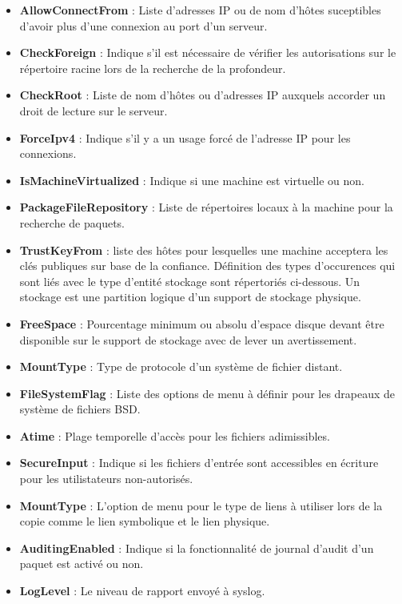 \begin{itemize}
  \item \textbf{AllowConnectFrom} : Liste d'adresses IP ou de nom d'hôtes
	  suceptibles d'avoir plus d'une connexion au port d'un serveur.
  \item \textbf{CheckForeign} : Indique s'il est nécessaire de vérifier les
	  autorisations sur le répertoire racine lors de la recherche de la
	  profondeur.
  \item \textbf{CheckRoot} : Liste de nom d'hôtes ou d'adresses IP auxquels
	  accorder un droit de lecture sur le serveur.
  \item \textbf{ForceIpv4} : Indique s'il y a un usage forcé de l'adresse IP
	  pour les connexions.
  \item \textbf{IsMachineVirtualized} : Indique si une machine est virtuelle ou
	  non.
  \item \textbf{PackageFileRepository} : Liste de répertoires locaux à la
	  machine pour la recherche de paquets.
  \item \textbf{TrustKeyFrom} : liste des hôtes pour lesquelles une machine
	  acceptera les clés publiques sur base de la confiance. Définition des
	  types d'occurences qui sont liés avec le type d'entité stockage sont
	  répertoriés ci-dessous. Un stockage est une partition logique d'un
	  support de stockage physique.
  \item \textbf{FreeSpace} : Pourcentage minimum ou absolu d'espace disque
	  devant être disponible sur le support de stockage avec de lever un
	  avertissement.
  \item \textbf{MountType} : Type de protocole d'un système de fichier distant. 
  \item \textbf{FileSystemFlag} : Liste des options de menu à définir pour les
	  drapeaux de système de fichiers BSD. 
  \item \textbf{Atime} : Plage temporelle d'accès pour les fichiers
	  adimissibles.
  \item \textbf{SecureInput} : Indique si les fichiers d'entrée sont accessibles
	  en écriture pour les utilistateurs non-autorisés.
  \item \textbf{MountType} : L'option de menu pour le type de liens à utiliser
	  lors de la copie comme le lien symbolique et le lien physique.
  \item \textbf{AuditingEnabled} : Indique si la fonctionnalité de journal
	  d'audit d'un paquet est activé ou non.
  \item \textbf{LogLevel} : Le niveau de rapport envoyé à syslog.

\end{itemize}
